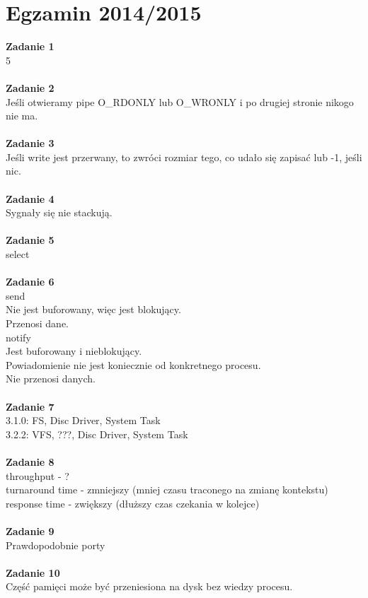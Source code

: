 \documentclass[12pt, a4paper, polish, openany]{book}
\begin{document}
\section{Egzamin 2014/2015}
\textbf{Zadanie 1} \\
5 \\\\
\textbf{Zadanie 2} \\
Jeśli otwieramy pipe O\_RDONLY lub O\_WRONLY i po drugiej stronie nikogo nie ma. \\\\
\textbf{Zadanie 3} \\
Jeśli write jest przerwany, to zwróci rozmiar tego, co udało się zapisać lub -1, jeśli nic. \\\\
\textbf{Zadanie 4} \\
Sygnały się nie stackują. \\\\
\textbf{Zadanie 5} \\
select \\\\
\textbf{Zadanie 6} \\
send \\
Nie jest buforowany, więc jest blokujący. \\
Przenosi dane. \\
notify \\
Jest buforowany i nieblokujący. \\
Powiadomienie nie jest koniecznie od konkretnego procesu. \\
Nie przenosi danych. \\\\
\textbf{Zadanie 7} \\
3.1.0: FS, Disc Driver, System Task \\
3.2.2: VFS, ???, Disc Driver, System Task \\\\
\textbf{Zadanie 8} \\
throughput - ? \\
turnaround time - zmniejszy (mniej czasu traconego na zmianę kontekstu) \\
response time - zwiększy (dłuższy czas czekania w kolejce) \\\\
\textbf{Zadanie 9} \\
Prawdopodobnie porty \\\\
\textbf{Zadanie 10} \\
Część pamięci może być przeniesiona na dysk bez wiedzy procesu. \\\\
\end{document}
